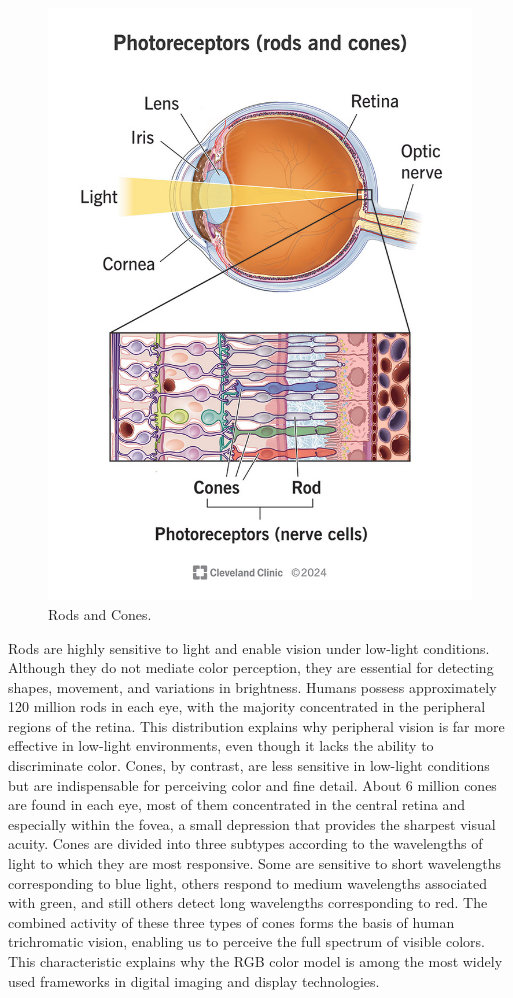 \documentclass[12pt]{report}
\begin{document}
\begin{figure}[ht]
    \centering
    \includegraphics[width = 0.6
    \textwidth]{Images/Theory/rods_cones.jpg}
    \caption{Rods and Cones.}
    \label{fig:rodscones}
\end{figure}

Rods are highly sensitive to light and enable vision under low-light conditions. 
Although they do not mediate color perception, they are essential for detecting shapes, movement, and variations in brightness. 
Humans possess approximately 120 million rods in each eye, with the majority concentrated in the peripheral regions of the retina. 
This distribution explains why peripheral vision is far more effective in low-light environments, even though it lacks the ability to discriminate color.
Cones, by contrast, are less sensitive in low-light conditions but are indispensable for perceiving color and fine detail.
About 6 million cones are found in each eye, most of them concentrated in the central retina and especially within the fovea, a small depression that provides the sharpest visual acuity.
Cones are divided into three subtypes according to the wavelengths of light to which they are most responsive.
Some are sensitive to short wavelengths corresponding to blue light, others respond to medium wavelengths associated with green, and still others detect long wavelengths corresponding to red. 
The combined activity of these three types of cones forms the basis of human trichromatic vision, enabling us to perceive the full spectrum of visible colors.
This characteristic explains why the RGB color model is among the most widely used frameworks in digital imaging and display technologies.
\end{document}
